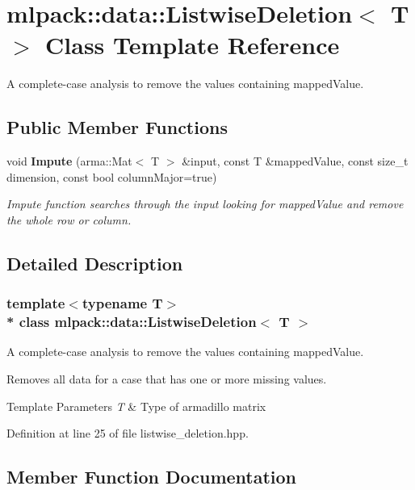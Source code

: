 \section{mlpack\+:\+:data\+:\+:Listwise\+Deletion$<$ T $>$ Class Template Reference}
\label{classmlpack_1_1data_1_1ListwiseDeletion}


A complete-\/case analysis to remove the values containing mapped\+Value.  


\subsection*{Public Member Functions}
\begin{DoxyCompactItemize}
\item 
void {\bf Impute} (arma\+::\+Mat$<$ T $>$ \&input, const T \&mapped\+Value, const size\+\_\+t dimension, const bool column\+Major=true)
\begin{DoxyCompactList}\small\item\em Impute function searches through the input looking for mapped\+Value and remove the whole row or column. \end{DoxyCompactList}\end{DoxyCompactItemize}


\subsection{Detailed Description}
\subsubsection*{template$<$typename T$>$\\*
class mlpack\+::data\+::\+Listwise\+Deletion$<$ T $>$}

A complete-\/case analysis to remove the values containing mapped\+Value. 

Removes all data for a case that has one or more missing values. 
\begin{DoxyTemplParams}{Template Parameters}
{\em T} & Type of armadillo matrix \\
\hline
\end{DoxyTemplParams}


Definition at line 25 of file listwise\+\_\+deletion.\+hpp.



\subsection{Member Function Documentation}

